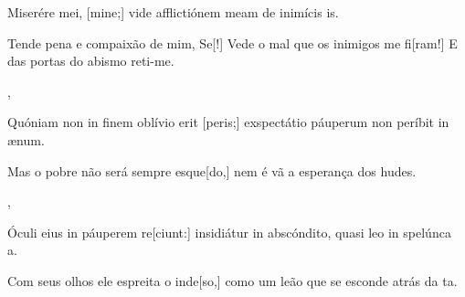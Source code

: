 {  {\item {}Miserére mei, [mine;] vide afflictiónem meam de inimícis is.~\Responsorium}%
    {\item {}Tende pena e compaixão de mim, Se[!] Vede o mal que os inimigos me fi[ram!] E das portas do abismo reti-me.~\Responsorium},
  {\item {}Quóniam non in finem oblívio erit [peris;] exspectátio páuperum non períbit in ænum.~\Responsorium}%
    {\item {}Mas o pobre não será sempre esque[do,] nem é vã a esperança dos hudes.~\Responsorium},
  {\item {}Óculi eius in páuperem re[ciunt:] insidiátur in abscóndito, quasi leo in spelúnca a.~\Responsorium}%
    {\item {}Com seus olhos ele espreita o inde[so,] como um leão que se esconde atrás da ta.~\Responsorium}
}